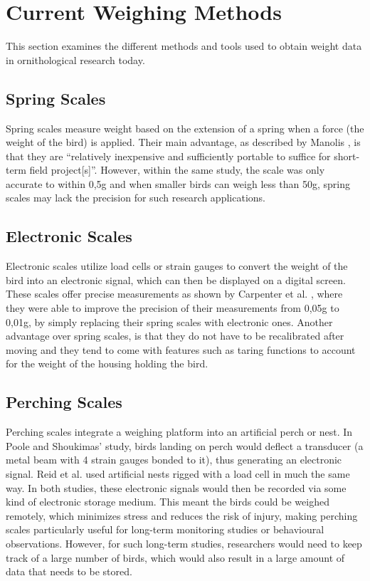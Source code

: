 \documentclass[class=report,11pt,crop=false]{standalone}
\begin{document}
\section{Current Weighing Methods}
This section examines the different methods and tools used to obtain weight data in ornithological research today.

\subsection{Spring Scales}
Spring scales measure weight based on the extension of a spring when a force (the weight of the bird) is applied. Their main advantage, as described by Manolis \cite{manoils2024simple}, is that they are “relatively inexpensive and sufficiently portable to suffice for short-term field project[s]”. However, within the same study, the scale was only accurate to within 0,5g and when smaller birds can weigh less than 50g, spring scales may lack the precision for such research applications.

\subsection{Electronic Scales}
Electronic scales utilize load cells or strain gauges to convert the weight of the bird into an electronic signal, which can then be displayed on a digital screen. These scales offer precise measurements as shown by Carpenter et al. \cite{carpenter1983weight}, where they were able to improve the precision of their measurements from 0,05g to 0,01g, by simply replacing their spring scales with electronic ones. Another advantage over spring scales, is that they do not have to be recalibrated after moving \cite{carpenter1983weight} and they tend to come with features such as taring functions to account for the weight of the housing holding the bird.

\subsection{Perching Scales}
Perching scales integrate a weighing platform into an artificial perch or nest. In Poole and Shoukimas’ \cite{poole1982scale} study, birds landing on perch would deflect a transducer (a metal beam with 4 strain gauges bonded to it), thus generating an electronic signal. Reid et al. \cite{reid1999measurement} used artificial nests rigged with a load cell in much the same way. In both studies, these electronic signals would then be recorded via some kind of electronic storage medium. This meant the birds could be weighed remotely, which minimizes stress and reduces the risk of injury, making perching scales particularly useful for long-term monitoring studies or behavioural observations. However, for such long-term studies, researchers would need to keep track of a large number of birds, which would also result in a large amount of data that needs to be stored.
\end{document}
